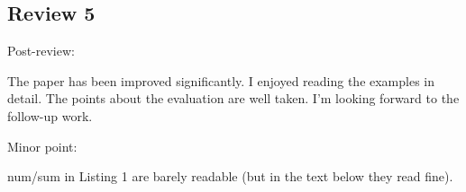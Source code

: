 
\subsection*{Review 5}

Post-review:

The paper has been improved significantly. I enjoyed reading the examples in detail. The points about the evaluation are well taken. I'm looking forward to the follow-up work.

Minor point:

num/sum in Listing 1 are barely readable (but in the text below they read fine).

